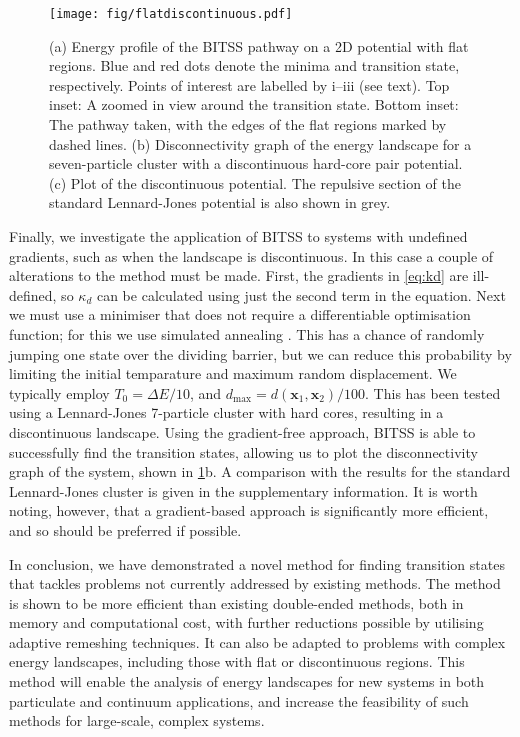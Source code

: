 \documentclass[aps,prl,twocolumn,10pt,groupedaddress]{revtex4-2}
\begin{document}
\begin{figure}[tb]
  \texttt{[image: fig/flatdiscontinuous.pdf]}
  \caption{\label{fig:flatdiscontinuous}
    (a) Energy profile of the BITSS pathway on a 2D potential with flat regions.
        Blue and red dots denote the minima and transition state, respectively.
        Points of interest are labelled by i--iii (see text).
        Top inset: A zoomed in view around the transition state.
        Bottom inset: The pathway taken, with the edges of the flat regions marked by dashed lines.
    (b) Disconnectivity graph of the energy landscape for a seven-particle cluster with a discontinuous hard-core pair potential.
    (c) Plot of the discontinuous potential.
        The repulsive section of the standard Lennard-Jones potential is also shown in grey.
  }
\end{figure}


Finally, we investigate the application of BITSS to systems with undefined gradients, such as when the landscape is discontinuous.
In this case a couple of alterations to the method must be made.
First, the gradients in \cref{eq:kd} are ill-defined, so $\kappa_d$ can be calculated using just the second term in the equation.
Next we must use a minimiser that does not require a differentiable optimisation function; for this we use simulated annealing \cite{Kirkpatrick1983}.
This has a chance of randomly jumping one state over the dividing barrier, but we can reduce this probability by limiting the initial temparature and maximum random displacement. We typically employ $T_0 = \Delta E / 10$, and $d_\text{max} = d(\bm{x}_1, \bm{x}_2) / 100$.
This has been tested using a Lennard-Jones 7-particle cluster with hard cores, resulting in a discontinuous landscape.
Using the gradient-free approach, BITSS is able to successfully find the transition states, allowing us to plot the disconnectivity graph of the system, shown in \cref{fig:flatdiscontinuous}b.
A comparison with the results for the standard Lennard-Jones cluster is given in the supplementary information.
It is worth noting, however, that a gradient-based approach is significantly more efficient, and so should be preferred if possible.


In conclusion, we have demonstrated a novel method for finding transition states that tackles problems not currently addressed by existing methods.
The method is shown to be more efficient than existing double-ended methods, both in memory and computational cost, with further reductions possible by utilising adaptive remeshing techniques.
It can also be adapted to problems with complex energy landscapes, including those with flat or discontinuous regions.
This method will enable the analysis of energy landscapes for new systems in both particulate and continuum applications, and increase the feasibility of such methods for large-scale, complex systems.
\end{document}
